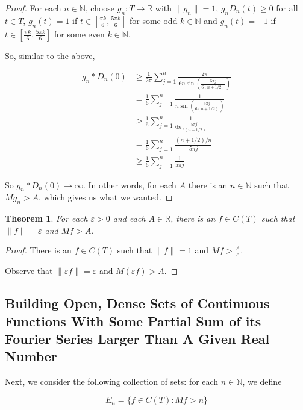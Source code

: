 \documentclass{amsart}
\newcommand{\vep}{\varepsilon}
\newcommand{\N}{\mathbb{N}}
\newcommand{\R}{\mathbb{R}}
\newcommand{\norm}[1]{\|#1\|}
\newtheorem{thm}{Theorem}[section]
\theoremstyle{definition}
\begin{document}
\begin{proof}
For each $n \in \N$, choose $g_n: T \to \R$ with $\norm{g_n} = 1$, $g_nD_n(t) \geq 0$ for all $t \in T$,  $g_n(t) = 1$ if $t \in [\frac{\pi k}{6},\frac{5 \pi k}{6}]$ for some odd $k \in \N$  and $g_n(t) = -1$ if $t \in [\frac{\pi k}{6},\frac{5 \pi k}{6}]$ for some even $k \in \N$.


So, similar to the above,

\begin{align*}
g_n \ast D_n(0) &\geq \frac{1}{2 \pi} \sum\limits_{j=1}^n \frac{2 \pi}{6n \sin(\frac{5\pi j}{6(n+1/2)})}\\
&= \frac{1}{6} \sum\limits_{j=1}^n \frac{1}{n \sin(\frac{5\pi j}{6(n+1/2)})}\\
&\geq \frac{1}{6} \sum\limits_{j=1}^n \frac{1}{6n \frac{5\pi j}{6(n+1/2)}}\\
&= \frac{1}{6} \sum\limits_{j=1}^n \frac{(n+1/2)/{n}}{5\pi j}\\
&\geq \frac{1}{6} \sum\limits_{j=1}^n \frac{1}{5\pi j}
\end{align*}

So $g_n \ast D_n(0) \to \infty$. In other words, for each $A$ there is an $n \in \N$ such that $Mg_n > A$, which gives us what we wanted.

\end{proof}

\begin{thm}
For each $\vep >0$ and each $A \in \R$, there is an $f \in C(T)$ such that $\norm{f} = \vep $ and $Mf > A$. 

\end{thm}

\begin{proof}
There is an $f \in C(T)$ such that $\norm{f} = 1$ and $Mf > \frac{A}{\vep}$.

Observe that $\norm{\vep f} = \vep$ and $M(\vep f) > A$.

\end{proof}

\subsection{Building Open, Dense Sets of Continuous Functions With Some Partial Sum of its Fourier Series Larger Than A Given Real Number}

Next, we consider the following collection of sets: for each $n \in \N$, we define

\begin{displaymath}
E_n = \{f \in C(T) : Mf > n\}
\end{displaymath}
\end{document}
